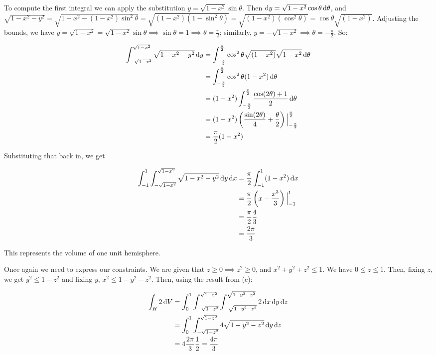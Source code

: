 To compute the first integral we can apply the substitution $y = \sqrt{1 - x^2}\sin\theta$. Then $\mathop{}\!\mathrm{d} y = \sqrt{1 - x^2}\cos\theta \mathop{}\!\mathrm{d} \theta$, and $\sqrt{1 - x^2 - y^2} = \sqrt{1 - x^2 - (1 - x^2)\sin^2\theta} = \sqrt{(1 - x^2)(1 - \sin^2\theta)} = \sqrt{(1 - x^2)(\cos^2\theta)} = \cos\theta\sqrt{(1 - x^2)}$. Adjusting the bounds, we have $y = \sqrt{1 - x^2} = \sqrt{1 - x^2}\sin\theta \implies \sin\theta = 1 \implies \theta = \frac{\pi}{2}$; similarly, $y = -\sqrt{1 - x^2} \implies \theta = -\frac{\pi}{2}$. So:

\begin{align*}
  \int_{-\sqrt{1 - x^2}}^{\sqrt{1 - x^2}} \sqrt{1 - x^2 - y^2} \mathop{}\!\mathrm{d} y &= \int_{-\frac{\pi}{2}}^{\frac{\pi}{2}} \cos^2\theta\sqrt{(1 - x^2)}\sqrt{1 - x^2} \mathop{}\!\mathrm{d} \theta \\
  &= \int_{-\frac{\pi}{2}}^{\frac{\pi}{2}} \cos^2\theta(1 - x^2) \mathop{}\!\mathrm{d} \theta \\
  &= (1 - x^2) \int_{-\frac{\pi}{2}}^{\frac{\pi}{2}} \frac{\cos(2\theta) + 1}{2} \mathop{}\!\mathrm{d} \theta \\
  &= (1 - x^2) \left(\frac{\sin(2\theta)}{4} + \frac{\theta}{2}\right) \Big|_{-\frac{\pi}{2}}^{\frac{\pi}{2}} \\
  &= \frac{\pi}{2}(1 - x^2)
\end{align*}

Substituting that back in, we get

\begin{align*}
  \int_{-1}^1 \int_{-\sqrt{1 - x^2}}^{\sqrt{1 - x^2}} \sqrt{1 - x^2 - y^2} \mathop{}\!\mathrm{d} y \mathop{}\!\mathrm{d} x &= \frac{\pi}{2} \int_{-1}^1 (1 - x^2) \mathop{}\!\mathrm{d} x \\
  &= \frac{\pi}{2} \left(x - \frac{x^3}{3}\right)\Big|_{-1}^1 \\
  &= \frac{\pi}{2} \frac{4}{3} \\
  &= \frac{2\pi}{3}
\end{align*}

This represents the volume of one unit hemisphere.

Once again we need to express our constraints. We are given that $z \geq 0 \implies z^2 \geq 0$, and $x^2 + y^2 + z^2 \leq 1$. We have $0 \leq z \leq 1$. Then, fixing $z$, we get $y^2 \leq 1 - z^2$ and fixing $y$, $x^2 \leq 1 - y^2 - z^2$. Then, using the result from (c):

\begin{align*}
  \int_H 2 \mathop{}\!\mathrm{d} V &= \int_0^1 \int_{-\sqrt{1 - z^2}}^{\sqrt{1 - z^2}} \int_{-\sqrt{1 - y^2 - z^2}}^{\sqrt{1 - y^2 - z^2}} 2 \mathop{}\!\mathrm{d} x \mathop{}\!\mathrm{d} y \mathop{}\!\mathrm{d} z \\
  &= \int_0^1 \int_{-\sqrt{1 - z^2}}^{\sqrt{1 - z^2}} 4\sqrt{1 - y^2 - z^2} \mathop{}\!\mathrm{d} y \mathop{}\!\mathrm{d} z \\
  &= 4 \frac{2\pi}{3} \frac{1}{2} = \frac{4\pi}{3}
\end{align*}

